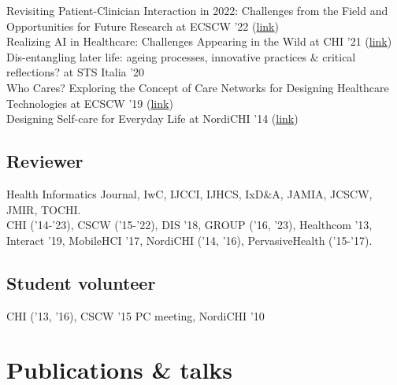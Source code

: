 \documentclass[11pt, a4paper]{article} %
\newcommand{\years}[1]{\marginnote{\scriptsize #1}} %
\begin{document}
\years{2022}Revisiting Patient-Clinician Interaction in 2022: Challenges from the Field and Opportunities for Future Research at ECSCW '22 (\href{http://francisconunes.me/RevisitingPatientClinicianInteractionWS/index.html}{link})\\
\years{2021}Realizing AI in Healthcare: Challenges Appearing in the Wild at CHI '21 (\href{http://francisconunes.me/RealizingAIinHealthcareWS/index.html}{link})\\
\years{2020}Dis-entangling later life: ageing processes, innovative practices \& critical reflections? at STS Italia '20\\
\years{2019}Who Cares? Exploring the Concept of Care Networks for Designing Healthcare Technologies at ECSCW '19 (\href{http://francisconunes.me/CareNetworksWS/}{link})\\
\years{2014}Designing Self-care for Everyday Life at NordiCHI '14 (\href{https://designingselfcareforeverydaylife.wordpress.com/}{link})

\subsection*{Reviewer}

Health Informatics Journal, IwC, IJCCI, IJHCS, IxD\&A, JAMIA, JCSCW, JMIR, TOCHI.\\
CHI ('14-'23), CSCW ('15-'22), DIS '18, GROUP ('16, '23), Healthcom '13, Interact '19, MobileHCI '17, NordiCHI ('14, '16), PervasiveHealth ('15-'17).

\subsection*{Student volunteer}

CHI ('13, '16), CSCW '15 PC meeting, NordiCHI '10






\section*{Publications \& talks}
\end{document}
